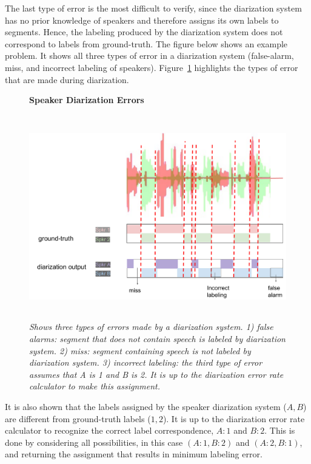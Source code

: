 The last type of error is the most difficult to verify, since the diarization system has no prior knowledge of speakers and therefore assigns its own labels to segments. 
Hence, the labeling produced by the diarization system does not correspond to labels from ground-truth. The figure below shows an example problem. It shows all three types of error in a diarization system (false-alarm, miss, and incorrect labeling of speakers). 
Figure~\ref{fig:diarization_der} highlights the types of error that are made during diarization. 

\begin{figure}[h!]
	\centering
	\textbf{Speaker Diarization Errors}\par\medskip
	\includegraphics[height = 3.5in, width=1\textwidth]{figures/diarization_example_der}
	\caption{\it \small Shows three types of errors made by a diarization system. 1) false alarms: segment that does not contain speech is labeled by diarization system. 2) miss: segment containing speech is not labeled by diarization system. 
		3) incorrect labeling: the third type of error assumes that A is 1 and B is 2. It is up to the diarization error rate calculator to make this assignment.}
	\label{fig:diarization_der}
	\vspace{-3mm}
\end{figure}

It is also shown that the labels assigned by the speaker diarization system ($A, B$) are different from ground-truth labels ($1, 2$). 
It is up to the diarization error rate calculator to recognize the correct label correspondence, $A:1$ and $B:2$. 
This is done by considering all possibilities, in this case $(A:1,B:2)$ and $(A:2,B:1)$, and returning the assignment that results in minimum labeling error. 


